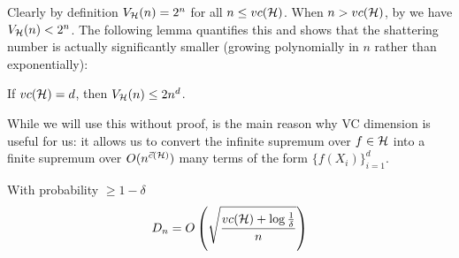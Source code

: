 Clearly by definition $V_{\mathcal{H}}(n) = 2^n$ for all $n \leq vc(\mathcal{H})$.
When $n > vc(\mathcal{H})$, by  we have $V_{\mathcal{H}}(n) < 2^n$.
The following lemma quantifies this and shows that the shattering number
is actually significantly smaller (growing polynomially in $n$ rather than exponentially):
\begin{lemma}\label{lem:sauer-shelah}
    If $vc(\mathcal{H}) = d$, then $V_{\mathcal{H}}(n) \leq 2 n^d$.
\end{lemma}
While we will use this without proof,  is the main reason why VC dimension
is useful for us: it allows us to convert the infinite supremum over $f \in \mathcal{H}$ into a finite supremum over
$O(n^{\vec{c}(\mathcal{H})})$ many terms of the form $\{f(X_i)\}_{i=1}^d$.

\begin{theorem}[VC inequality]\label{thm:vc-inequality}
    With probability $\geq 1 - \delta$
    \begin{align}
        D_n = O\left(\sqrt{\frac{vc(\mathcal{H}) + \log \frac{1}{\delta}}{n}}\right)
    \end{align}
\end{theorem}

